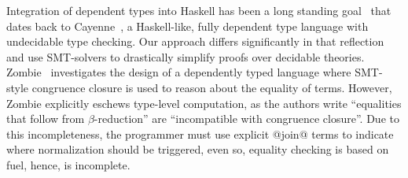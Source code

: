 %

%
Integration of dependent types into Haskell
has been a long standing goal~\citep{EisenbergS14}
that dates back to Cayenne~\citep{cayenne},
a Haskell-like, fully dependent type
language with undecidable type checking.
%
%
Our approach differs significantly in that
reflection and \pbesym use SMT-solvers
to drastically simplify proofs over decidable
theories.
%
Zombie~\citep{Sjoberg2015} investigates
the design of a dependently typed language where
SMT-style congruence closure is used to reason
about the equality of terms.
%
However, Zombie explicitly eschews type-level
computation, as the authors write
``equalities that follow from $\beta$-reduction''
are ``incompatible with congruence closure''.
%
Due to this incompleteness, the programmer must
use explicit @join@ terms to indicate where
normalization should be triggered, even
so, equality checking is based on fuel,
hence, is incomplete.
%


%

